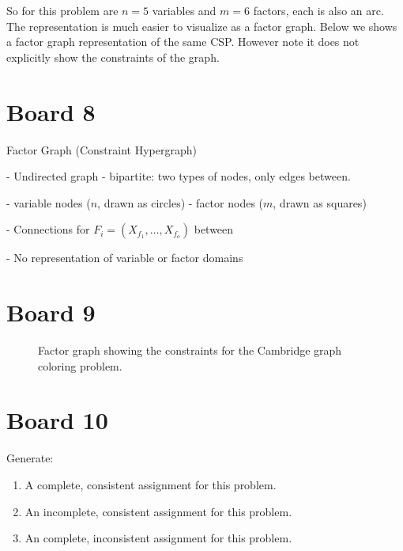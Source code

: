 \documentclass[10pt]{article}
\begin{document}
So for this problem are $n= 5$ variables and $m=6$ factors, each is also an arc. The representation is much easier to visualize as a factor graph. Below we shows a factor graph representation of the same CSP. 
However note it does not explicitly show the constraints of the graph. 

\section{Board 8}

Factor Graph (Constraint Hypergraph)

- Undirected graph 
- bipartite: two types of nodes, only edges between.

- variable nodes ($n$, drawn as circles)
- factor nodes ($m$, drawn as squares)

- Connections for $F_i= (X_{f_1}, \ldots, X_{f_o})$ between

- No representation of variable or factor domains  

\section{Board 9}
\air
\begin{figure}[h]
  \centering
  \label{fig:cambfactor}
  \caption{Factor graph showing the constraints for the Cambridge 
  graph coloring problem. }
\end{figure}
\air



\section{Board 10}

\begin{exercise}
  Generate: 

  \begin{enumerate}
  \item A complete, consistent assignment for this problem.
  \item An incomplete, consistent assignment for this problem.
  \item An complete, inconsistent assignment for this problem.
  \end{enumerate}
\end{exercise}
\end{document}
